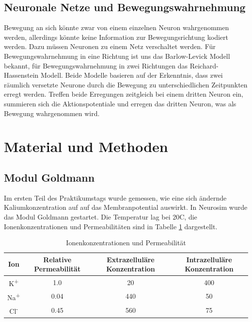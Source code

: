 \documentclass[a4paper]{article}
\begin{document}
\subsection{Neuronale Netze und Bewegungswahrnehmung}
Bewegung an sich könnte zwar von einem einzelnen Neuron wahrgenommen werden, allerdings könnte keine Information zur Bewegungsrichtung kodiert werden. Dazu müssen Neuronen zu einem Netz verschaltet werden. Für Bewegungswahrnehmung in eine Richtung ist uns das Barlow-Levick Modell\cite{BarlowLevick} bekannt, für Bewegungswahrnehmung in zwei Richtungen das Reichard-Hassenstein Modell\cite{Reichardt1987}. Beide Modelle basieren auf der Erkenntnis, dass zwei räumlich versetzte Neurone durch die Bewegung zu unterschiedlichen Zeitpunkten erregt werden. Treffen beide Erregungen zeitgleich bei einem dritten Neuron ein, summieren sich die Aktionspotentiale und erregen das dritten Neuron, was als Bewegung wahrgenommen wird.
\newpage
\section{Material und Methoden}
\subsection{Modul Goldmann}
Im ersten Teil des Praktikumstags wurde gemessen, wie eine sich ändernde Kaliumkonzentration auf auf das Membranpotential auswirkt. In Neurosim wurde das Modul Goldmann gestartet. Die Temperatur lag bei 20\textdegree{}C, die Ionenkonzentrationen und Permeabilitäten sind in Tabelle \ref{tab:A1_1} dargestellt.\\
\begin{table}[H]
    \centering
    \caption{Ionenkonzentrationen und Permeabilität}
    \begin{tabular}{|c|c|c|c|}
        \hline
        \textbf{Ion} & \textbf{Relative Permeabilität} & \textbf{Extrazelluläre Konzentration} & \textbf{Intrazelluläre Konzentration}\\
        \hline
        K\textsuperscript{+} & 1.0 & 20 & 400\\
        \hline
        Na\textsuperscript{+} & 0.04 & 440 & 50\\
        \hline
        Cl\textsuperscript{-} & 0.45 & 560 & 75\\
        \hline
    \end{tabular}
    \label{tab:A1_1}
\end{table}
\end{document}
